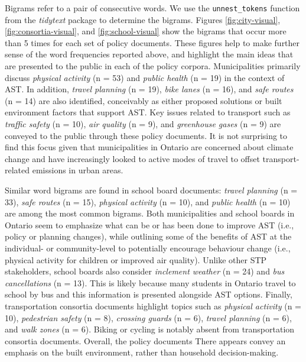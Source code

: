 \documentclass[]{elsarticle} %
\begin{document}
Bigrams refer to a pair of consecutive words. We use the
\texttt{unnest\_tokens} function from the \emph{tidytext} package to
determine the bigrams. Figures \ref{fig:city-visual},
\ref{fig:consortia-visual}, and \ref{fig:school-visual} show the bigrams
that occur more than 5 times for each set of policy documents. These
figures help to make further sense of the word frequencies reported
above, and highlight the main ideas that are presented to the public in
each of the policy corpora. Municipalities primarily discuss
\emph{physical activity} (n = 53) and \emph{public health} (n = 19) in
the context of AST. In addition, \emph{travel planning} (n = 19),
\emph{bike lanes} (n = 16), and \emph{safe routes} (n = 14) are also
identified, conceivably as either proposed solutions or built
environment factors that support AST. Key issues related to transport
such as \emph{traffic safety} (n = 10), \emph{air quality} (n = 9), and
\emph{greenhouse gases} (n = 9) are conveyed to the public through these
policy documents. It is not surprising to find this focus given that
municipalities in Ontario are concerned about climate change and have
increasingly looked to active modes of travel to offset
transport-related emissions in urban areas.

Similar word bigrams are found in school board documents: \emph{travel
planning} (n = 33), \emph{safe routes} (n = 15), \emph{physical
activity} (n = 10), and \emph{public health} (n = 10) are among the most
common bigrams. Both municipalities and school boards in Ontario seem to
emphasize what can be or has been done to improve AST (i.e., policy or
planning changes), while outlining some of the benefits of AST at the
individual- or community-level to potentially encourage behaviour change
(i.e., physical activity for children or improved air quality). Unlike
other STP stakeholders, school boards also consider \emph{inclement
weather} (n = 24) and \emph{bus cancellations} (n = 13). This is likely
because many students in Ontario travel to school by bus and this
information is presented alongside AST options. Finally, transportation
consortia documents highlight topics such as \emph{physical activity} (n
= 10), \emph{pedestrian safety} (n = 8), \emph{crossing guards} (n = 6),
\emph{travel planning} (n = 6), and \emph{walk zones} (n = 6). Biking or
cycling is notably absent from transportation consortia documents.
Overall, the policy documents There appears convey an emphasis on the
built environment, rather than household decision-making.
\end{document}
